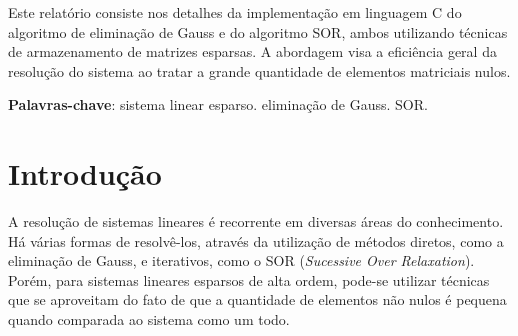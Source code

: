 \documentclass[
	article,			%
	11pt,				%
	oneside,			%
	a4paper,			%
	english,			%
	brazil,				%
	sumario=tradicional
	]{abntex2}
\begin{document}

\frenchspacing 


%
%
\maketitle

\begin{resumoumacoluna}
 Este relatório consiste nos detalhes da implementação em linguagem C do algoritmo de eliminação de Gauss e do algoritmo SOR, ambos utilizando técnicas de armazenamento de matrizes esparsas. A abordagem visa a eficiência geral da resolução do sistema ao tratar a grande quantidade de elementos matriciais nulos.
 
 \vspace{\onelineskip}
 
 \noindent
 \textbf{Palavras-chave}: sistema linear esparso. eliminação de Gauss. SOR.
\end{resumoumacoluna}


\textual

\section*{Introdução}

A resolução de sistemas lineares é recorrente em diversas áreas do conhecimento. Há várias formas de resolvê-los, através da utilização de métodos diretos, como a eliminação de Gauss, e iterativos, como o SOR (\emph{Sucessive Over Relaxation}). Porém, para sistemas lineares esparsos de alta ordem, pode-se utilizar técnicas que se aproveitam do fato de que a quantidade de elementos não nulos é pequena quando comparada ao sistema como um todo.
\end{document}
